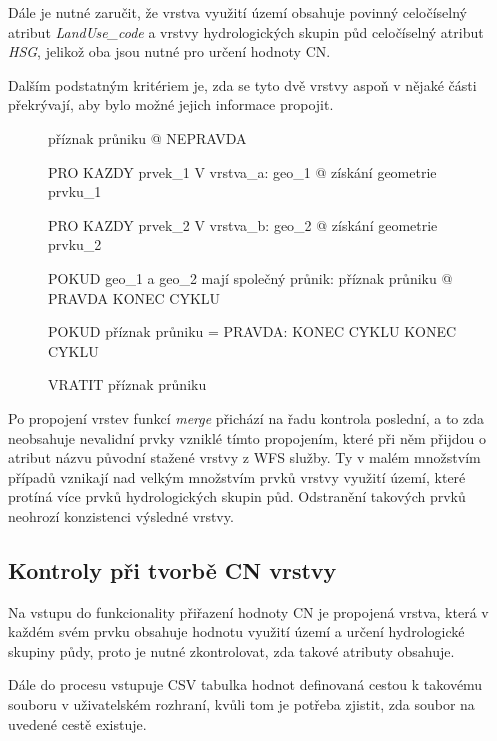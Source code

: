 \documentclass[a4paper,oneside,12pt]{book}
\begin{document}
\hspace{10mm} Dále je nutné zaručit, že vrstva využití území obsahuje povinný celočíselný atribut \textit{LandUse\_code} a vrstvy hydrologických skupin půd  celočíselný atribut \textit{HSG}, jelikož oba jsou nutné pro určení hodnoty CN.

\hspace{10mm} Dalším podstatným kritériem je, zda se tyto dvě vrstvy aspoň v nějaké části překrývají, aby bylo možné jejich informace propojit.

\begin{figure}[H]
\begin{pseudocode}[style=mypseudocode, caption={Ukázka kontroly překrytí obou vrstev},label={kod:overlap_check}]
příznak průniku @ NEPRAVDA

PRO KAZDY prvek_1 V vrstva_a:
    geo_1 @ získání geometrie prvku_1

    PRO KAZDY prvek_2 V vrstva_b:
        geo_2 @ získání geometrie prvku_2
        
        POKUD geo_1 a geo_2 mají společný průnik:
            příznak průniku @  PRAVDA
            KONEC CYKLU

    POKUD příznak průniku = PRAVDA:
        KONEC CYKLU
KONEC CYKLU

VRATIT příznak průniku 


\end{pseudocode}
\end{figure}

\hspace{10mm} Po propojení vrstev funkcí \textit{merge} přichází na řadu kontrola poslední, a to zda neobsahuje nevalidní prvky vzniklé tímto propojením, které při něm přijdou o atribut názvu původní stažené vrstvy z WFS služby. Ty v malém množstvím případů vznikají nad velkým množstvím prvků vrstvy využití území, které protíná více prvků hydrologických skupin půd. Odstranění takových prvků neohrozí konzistenci výsledné vrstvy.

\subsection{Kontroly při tvorbě CN vrstvy} \label{CN_checks}
\hspace{10mm} Na vstupu do funkcionality přiřazení hodnoty CN je propojená vrstva, která v každém svém prvku obsahuje hodnotu využití území a určení hydrologické skupiny půdy, proto je nutné zkontrolovat, zda takové atributy obsahuje.

\hspace{10mm} Dále do procesu vstupuje CSV tabulka hodnot definovaná cestou k takovému souboru v uživatelském rozhraní, kvůli tom je potřeba zjistit, zda soubor na uvedené cestě existuje.
\end{document}
